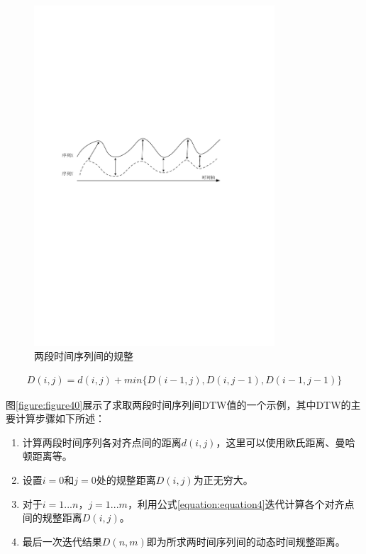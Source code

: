 \begin{figure}[htbp]
    \centering
    \includegraphics[width=0.8\textwidth]{figures/dtw.pdf}
    \caption{两段时间序列间的规整}\label{figure:figure39}
\end{figure}
\vspace{-1em}
\begin{equation}
    \label{equation:equation4}
    \begin{aligned}
        D(i,j) = d(i,j) + min\{D(i-1,j),D(i,j-1),D(i-1,j-1)\}
    \end{aligned}
\end{equation}

图\ref{figure:figure40}展示了求取两段时间序列间DTW值的一个示例，其中DTW的主要计算步骤如下所述：
\begin{enumerate}
  \item 计算两段时间序列各对齐点间的距离$d(i,j)$，这里可以使用欧氏距离、曼哈顿距离等。
  \item 设置$i = 0$和$j = 0$处的规整距离$D(i,j)$为正无穷大。
  \item 对于$i = 1 ... n$，$j = 1 ... m$，利用公式\ref{equation:equation4}迭代计算各个对齐点间的规整距离$D(i,j)$。
  \item 最后一次迭代结果$D(n,m)$即为所求两时间序列间的动态时间规整距离。
\end{enumerate}


